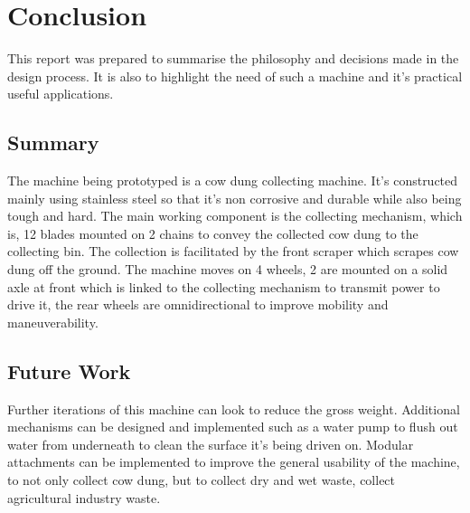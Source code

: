 \chapter{Conclusion} \label{Conclusion}

This report was prepared to summarise the philosophy and decisions made in the design process. It is also to highlight the need of such a machine and it's practical useful applications.

\section{Summary} \label{Summary}
The machine being prototyped is a cow dung collecting machine. It's constructed mainly using stainless steel so that it's non corrosive and durable while also being tough and hard. The main working component is the collecting mechanism, which is, 12 blades mounted on 2 chains to convey the collected cow dung to the collecting bin. The collection is facilitated by the front scraper which scrapes cow dung off the ground. The machine moves on 4 wheels, 2 are mounted on a solid axle at front which is linked to the collecting mechanism to transmit power to drive it, the rear wheels are omnidirectional to improve mobility and maneuverability.



\section{Future Work} \label{Future Work}
Further iterations of this machine can look to reduce the gross weight. Additional mechanisms can be designed and implemented such as a water pump to flush out water from underneath to clean the surface it's being driven on. Modular attachments can be implemented to improve the general usability of the machine, to not only collect cow dung, but to collect dry and wet waste, collect agricultural industry waste. 
